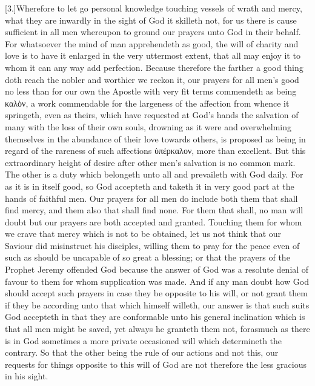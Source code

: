 [3.]Wherefore to let go personal knowledge touching vessels of wrath and mercy, what they are inwardly in the sight of God it skilleth not, for us there is cause sufficient in all men whereupon to ground our prayers unto God in their behalf. For whatsoever the mind of man apprehendeth as good, the will of charity and love is to have it enlarged in the very uttermost extent, that all may enjoy it to whom it can any way add perfection. Because therefore the farther a good thing doth reach the nobler and worthier we reckon it, our prayers for all men’s good no less than for our own the Apostle with very fit terms commendeth as being καλὸν, a work commendable for the largeness of the affection from whence it springeth, even as theirs, which have requested at God’s hands the salvation of many with the loss of their own souls, drowning as it were and overwhelming themselves in the abundance of their love towards others, is proposed as being in regard of the rareness of such affections ὑπέρκαλον, more than excellent. But this extraordinary height of desire after other men’s salvation is no common mark. The other is a duty which belongeth unto all and prevaileth with God daily. For as it is in itself good, so God accepteth and taketh it in very good part at the hands of faithful men. Our prayers for all men do include both them that shall find mercy, and them also that shall find none. For them that shall, no man will doubt but our prayers are both accepted and granted. Touching them for whom we crave that mercy which is not to be obtained, let us not think that our Saviour did misinstruct his disciples, willing them to pray for the peace even of such as should be uncapable of so great a blessing; or that the prayers of the Prophet Jeremy offended God because the answer of God was a resolute denial of favour to them for whom supplication was made. And if any man doubt how God should accept such prayers in case they be opposite to his will, or not grant them if they be according unto that which himself willeth, our answer is that such suits God accepteth in that they are conformable unto his general  inclination which is that all men might be saved,
 yet always he granteth them not, forasmuch as there is in God sometimes a more private occasioned will which determineth the contrary. So that the other being the rule of our actions and not this, our requests for things opposite to this will of God are not therefore the less gracious in his sight.

